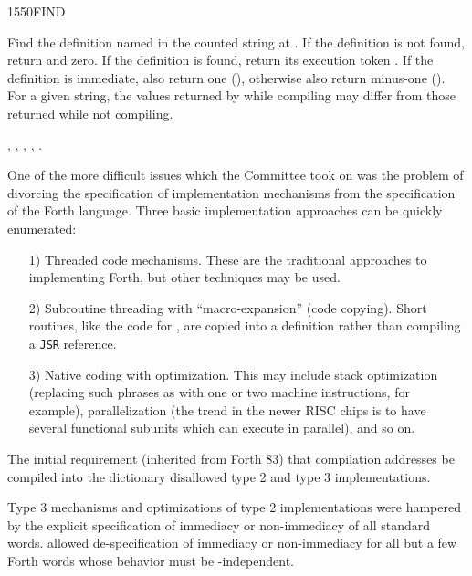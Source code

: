 \begin{worddef}{1550}{FIND}
\item {}

	Find the definition named in the counted string at .
	If the definition is not found, return  and zero.
	If the definition is found, return its execution token .
	If the definition is immediate, also return one (),
	otherwise also return minus-one (). For a given string,
	the values returned by  while compiling may differ
	from those returned while not compiling.

\see {},
	,
	,
	,
	.

	\begin{defer}
	\rationale %
		One of the more difficult issues which the Committee took on
		was the problem of divorcing the specification of
		implementation mechanisms from the specification of the
		Forth language. Three basic implementation approaches can be
		quickly enumerated:

		\begin{enumerate}
		\item[1)] Threaded code mechanisms.
			These are the traditional approaches to implementing Forth,
			but other techniques may be used.

		\item[2)] Subroutine threading with ``macro-expansion'' (code
			copying). Short routines, like the code for ,
			are copied into a definition rather than compiling a
			\texttt{JSR} reference.

		\item[3)] Native coding with optimization.
			This may include stack optimization (replacing such phrases
			as   \word{+} with one or two machine
			instructions, for example), parallelization (the trend in
			the newer RISC chips is to have several functional subunits
			which can execute in parallel), and so on.
		\end{enumerate}

		The initial requirement (inherited from Forth 83) that
		compilation addresses be compiled into the dictionary
		disallowed type 2 and type 3 implementations.

		Type 3 mechanisms and optimizations of type 2 implementations
		were hampered by the explicit specification of immediacy or
		non-immediacy of all standard words.  allowed
		de-specification of immediacy or non-immediacy for all but a
		few Forth words whose behavior must be -independent.


\end{defer}
\end{worddef}
